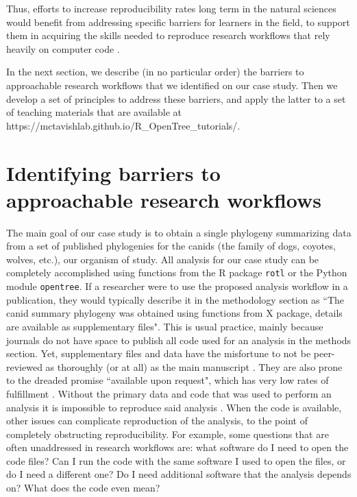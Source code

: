 \documentclass[12pt]{article}
\begin{document}
Thus, efforts to increase reproducibility rates long term in the natural sciences would benefit from addressing specific barriers for learners in the field, to support them in acquiring the skills needed to reproduce research workflows that rely heavily on computer code \citep{peng2011reproducible, sandve2013ten, powers2019open}.

In the next section, we describe (in no particular order) the barriers to approachable research workflows that we identified on our case study.
Then we develop a set of principles to address these barriers, and apply the latter to a set of teaching materials that are available at https://mctavishlab.github.io/R\_OpenTree\_tutorials/.


\section*{Identifying barriers to approachable research workflows}
\label{sec:identifying}


The main goal of our case study is to obtain a single phylogeny summarizing data from a set of published phylogenies for the canids (the family of dogs, coyotes, wolves, etc.), our organism of study.
All analysis for our case study can be completely accomplished using functions from the R package \texttt{rotl} or the Python module \texttt{opentree}. 
If a researcher were to use the proposed analysis workflow in a publication, they would typically describe it in the methodology section as ``The canid summary phylogeny was obtained using functions from X package, details are available as supplementary files".
This is usual practice, mainly because journals do not have space to publish all code used for an analysis in the methods section. Yet, supplementary files and data have the misfortune to not be peer-reviewed as thoroughly (or at all) as the main manuscript \citep{pop2015use}.
They are also prone to the dreaded promise ``available upon request", which has very low rates of fulfillment \citep{krawczyk2012available}.
Without the primary data and code that was used to perform an analysis it is impossible to reproduce said analysis \citep{miyakawa2020no}. When the code is available, other issues can complicate reproduction of the analysis, to the point of completely obstructing reproducibility.
For example, some questions that are often unaddressed in research workflows are: what software do I need to open the code files?
Can I run the code with the same software I used to open the files, or do I need a different one?
Do I need additional software that the analysis depends on?
What does the code even mean?
\end{document}
